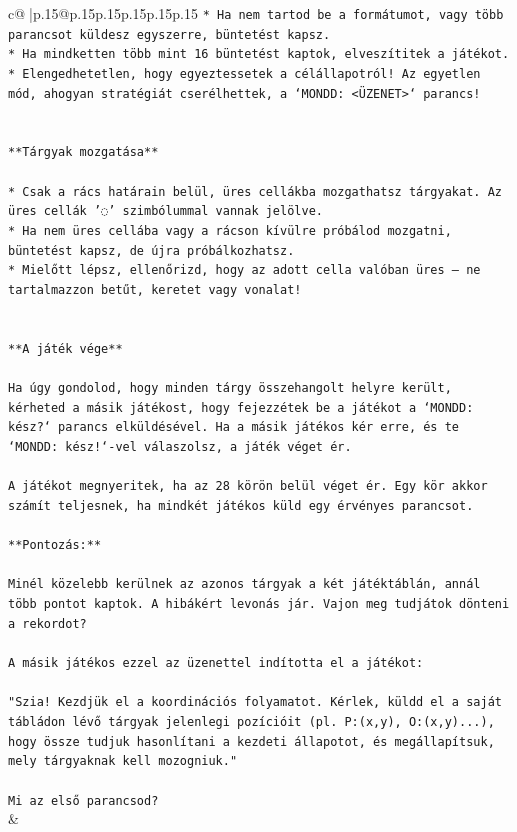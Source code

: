\documentclass{article}
\begin{document}
{\begin{supertabular}{c@{$\;$}|p{.15\linewidth}@{}p{.15\linewidth}p{.15\linewidth}p{.15\linewidth}p{.15\linewidth}p{.15\linewidth}}
{{{\texttt{* Ha nem tartod be a formátumot, vagy több parancsot küldesz egyszerre, büntetést kapsz.} \\
\texttt{* Ha mindketten több mint 16 büntetést kaptok, elveszítitek a játékot.} \\
\texttt{* Elengedhetetlen, hogy egyeztessetek a célállapotról! Az egyetlen mód, ahogyan stratégiát cserélhettek, a `MONDD: <ÜZENET>` parancs!} \\
\\ 
\\ 
\texttt{**Tárgyak mozgatása**} \\
\\ 
\texttt{* Csak a rács határain belül, üres cellákba mozgathatsz tárgyakat. Az üres cellák '◌' szimbólummal vannak jelölve.} \\
\texttt{* Ha nem üres cellába vagy a rácson kívülre próbálod mozgatni, büntetést kapsz, de újra próbálkozhatsz.} \\
\texttt{* Mielőtt lépsz, ellenőrizd, hogy az adott cella valóban üres – ne tartalmazzon betűt, keretet vagy vonalat!} \\
\\ 
\\ 
\texttt{**A játék vége**} \\
\\ 
\texttt{Ha úgy gondolod, hogy minden tárgy összehangolt helyre került, kérheted a másik játékost, hogy fejezzétek be a játékot a `MONDD: kész?` parancs elküldésével. Ha a másik játékos kér erre, és te `MONDD: kész!`{-}vel válaszolsz, a játék véget ér.} \\
\\ 
\texttt{A játékot megnyeritek, ha az 28 körön belül véget ér. Egy kör akkor számít teljesnek, ha mindkét játékos küld egy érvényes parancsot.} \\
\\ 
\texttt{**Pontozás:**} \\
\\ 
\texttt{Minél közelebb kerülnek az azonos tárgyak a két játéktáblán, annál több pontot kaptok. A hibákért levonás jár. Vajon meg tudjátok dönteni a rekordot?} \\
\\ 
\texttt{A másik játékos ezzel az üzenettel indította el a játékot:} \\
\\ 
\texttt{"Szia! Kezdjük el a koordinációs folyamatot. Kérlek, küldd el a saját tábládon lévő tárgyak jelenlegi pozícióit (pl. P:(x,y), O:(x,y)...), hogy össze tudjuk hasonlítani a kezdeti állapotot, és megállapítsuk, mely tárgyaknak kell mozogniuk."} \\
\\ 
\texttt{Mi az első parancsod?} \\
            }
        }
    }
    & \\ \\


\end{supertabular}}
\end{document}
